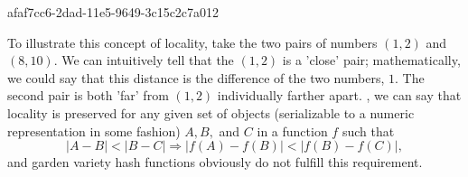 \documentclass[12pt]{article}
\begin{document}
afaf7cc6-2dad-11e5-9649-3c15c2c7a012\par To illustrate this concept of locality, take the two pairs of numbers $(1,2)$ and $(8,10)$. We can intuitively tell that the $(1,2)$ is a 'close' pair; mathematically, we could say that this distance is the difference of the two numbers, $1$. The second pair is both 'far' from $(1,2)$ individually farther apart. , we can say that locality is preserved for any given set of objects (serializable to a numeric representation in some fashion) $A,B,$ and $C$ in a function $f$ such that
\begin{equation}
|A-B| < |B-C| \Rightarrow |f(A)-f(B)| < |f(B) - f(C)|,
\end{equation}
and garden variety hash functions obviously do not fulfill this requirement.

\printbibliography
\end{document}
